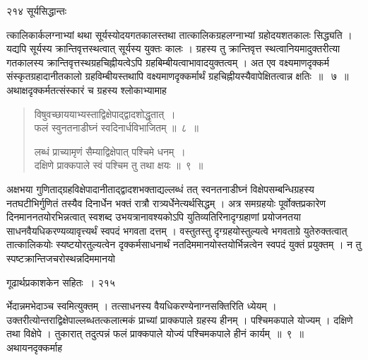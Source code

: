 \documentclass[11pt, openany]{book}
\begin{document}
\noindent २१४ \hspace{4cm} सूर्यसिद्धान्तः
\vspace{1cm}


\noindent त्कालिकार्कलग्नाभ्यां थथा सूर्यस्योदयगतकालस्तथा तात्कालिकग्रहलग्नाभ्यां ग्रहोदयशतकालः सिद्ध्यति । यद्यपि सूर्यस्य क्रान्तिवृत्तस्थत्वात् सूर्यस्य युक्तः कालः । ग्रहस्य तु क्रान्तिवृत्त स्थत्वानियमादुक्तरीत्या गतकालस्य क्रान्तिवृत्तस्थग्रहचिह्नीयत्वेऽपि ग्रहबिम्बीयत्वाभावादयुक्तत्वम् । अत एव वक्ष्यमाणदृक्कर्म संस्कृतग्रहादानीतकालो ग्रहविम्बीयस्तथापि वक्ष्यमाणदृक्कर्मार्थं ग्रहचिह्नीयस्यैवापेक्षितत्वान्न क्षतिः~॥~ ७~॥ \\
\noindent अथाक्षदृक्कर्मतत्संस्कारं च ग्रहस्य श्लोकाभ्यामाह \textendash


\begin{quote}
{\ssi विषुवच्छाययाभ्यस्ताद्विक्षेपाद्द्वादशोद्धृतात्~।\\
 फलं स्वुनतनाडीघ्नं स्वदिनार्धविभाजितम् ॥~८~॥

लब्धं प्राच्यामृणं सैम्याद्विक्षेपात् पश्चिमे धनम्~।\\
दक्षिणे प्राक्कपाले स्वं पश्चिम तु तथा क्षयः ॥~९~॥ }
\end{quote}


 अक्षभया गुणिताद्ग्रहविक्षेपादानीताद्द्वादशभक्ताद्यल्लब्धं तत् स्वनतनाडीघ्नं विक्षेपसम्बन्धिग्रहस्य नतघटीभिर्गुणितं तस्यैव दिनार्धेन भक्तं रात्रौ रात्र्यर्धेनेत्यर्थसिद्धम् । अत्र समग्रहयोः पूर्वोक्तप्रकारेण दिनमाननतयोरभिन्नत्वात् स्वशब्द उभयत्रानावश्यकोऽपि युतिव्यतिरिनादृग्ग्रहाणां प्रयोजनतया साधनवैयधिकरण्यव्यावृत्त्यर्थं स्वपदं भगवता दत्तम् । वस्तुतस्तु दृग्ग्रहयोस्तुल्यत्वे भगवताग्रे युतेरुक्तत्वात् तात्कालिकयोः स्यष्टयोरतुल्यत्वेन दृक्कर्मसाधनार्थं नतदिममानयोस्तयोर्भिन्नत्वेन स्वपदं युक्तं प्रयुक्तम् । न तु स्पष्टक्रान्तिजचरोस्थन्नदिममानयो \textendash


\newpage

\hspace{3cm} गूढार्थप्रकाशकेन सहितः~। \hfill २१५
\vspace{1cm}


\noindent र्भेदान्नमभेदाञ्च स्वमित्युक्तम् । तत्साधनस्य वैयधिकरण्येनाग्नसक्तिरिति ध्येयम् । उक्तरीत्योन्तराद्विक्षेपाल्लब्धतत्कलात्मकं प्राच्यां प्राक्कपाले ग्रहस्य हीनम् । पश्चिमकपाले योज्यम् । दक्षिणे तथा विक्षेपे । तुकारात् तदुत्पन्नं फलं प्राक्कपाले योज्यं पश्चिमकपाले हीनं कार्यम्~॥~९~॥\\
\noindent अथायनदृक्कर्माह \textendash
\end{document}
